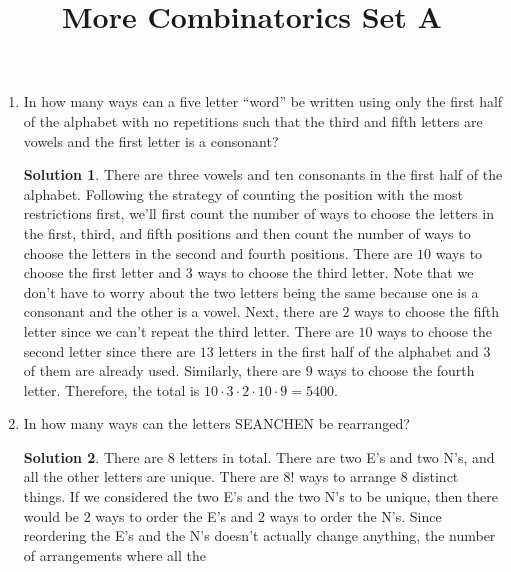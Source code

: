 \documentclass{article}
\title{More Combinatorics Set A}
\date{}
\author{}
\theoremstyle{definition}
\newtheorem*{solution}{Solution}
\begin{document}
\maketitle

\begin{multicols}{2}
    \begin{enumerate}
        \item In how many ways can a five letter ``word'' be written using only the 
            first half of the alphabet with no repetitions such that the third and 
            fifth letters are vowels and the first letter is a consonant?
            \begin{solution}
                There are three vowels and ten consonants in the first half of the 
                alphabet. Following the strategy of counting the position with the 
                most restrictions first, we'll first count the number of ways to 
                choose the letters in the first, third, and fifth positions and then 
                count the number of ways to choose the letters in the second and 
                fourth positions. There are $10$ ways to choose the first letter and 
                $3$ ways to choose the third letter. Note that we don't have to 
                worry about the two letters being the same because one is a 
                consonant and the other is a vowel. Next, there are $2$ ways to 
                choose the fifth letter since we can't repeat the third letter. 
                There are $10$ ways to choose the second letter since there are $13$ 
                letters in the first half of the alphabet and $3$ of them are 
                already used. Similarly, there are $9$ ways to choose the fourth 
                letter. Therefore, the total is $10 \cdot 3 \cdot 2 \cdot 10 \cdot 9 
                = 5400$.
            \end{solution}
        \item In how many ways can the letters SEANCHEN be rearranged?
            \begin{solution}
                There are $8$ letters in total. There are two E's and two N's, and 
                all the other letters are unique. There are $8!$ ways to arrange $8$ 
                distinct things. If we considered the two E's and the two N's to be 
                unique, then there would be $2$ ways to order the E's and $2$ ways 
                to order the N's. Since reordering the E's and the N's doesn't 
                actually change anything, the number of arrangements where all the 

\end{solution}
\end{enumerate}
\end{multicols}
\end{document}
